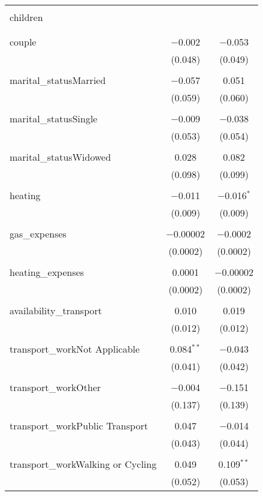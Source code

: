 \begin{tabular}{@{\extracolsep{5pt}}lcc}
  & & \\ 
 children &  &  \\ 
  &  &  \\ 
  & & \\ 
 couple & $-$0.002 & $-$0.053 \\ 
  & (0.048) & (0.049) \\ 
  & & \\ 
 marital\_statusMarried & $-$0.057 & 0.051 \\ 
  & (0.059) & (0.060) \\ 
  & & \\ 
 marital\_statusSingle & $-$0.009 & $-$0.038 \\ 
  & (0.053) & (0.054) \\ 
  & & \\ 
 marital\_statusWidowed & 0.028 & 0.082 \\ 
  & (0.098) & (0.099) \\ 
  & & \\ 
 heating & $-$0.011 & $-$0.016$^{*}$ \\ 
  & (0.009) & (0.009) \\ 
  & & \\ 
 gas\_expenses & $-$0.00002 & $-$0.0002 \\ 
  & (0.0002) & (0.0002) \\ 
  & & \\ 
 heating\_expenses & 0.0001 & $-$0.00002 \\ 
  & (0.0002) & (0.0002) \\ 
  & & \\ 
 availability\_transport & 0.010 & 0.019 \\ 
  & (0.012) & (0.012) \\ 
  & & \\ 
 transport\_workNot Applicable & 0.084$^{**}$ & $-$0.043 \\ 
  & (0.041) & (0.042) \\ 
  & & \\ 
 transport\_workOther & $-$0.004 & $-$0.151 \\ 
  & (0.137) & (0.139) \\ 
  & & \\ 
 transport\_workPublic Transport & 0.047 & $-$0.014 \\ 
  & (0.043) & (0.044) \\ 
  & & \\ 
 transport\_workWalking or Cycling & 0.049 & 0.109$^{**}$ \\ 
  & (0.052) & (0.053) \\ 

\end{tabular}
